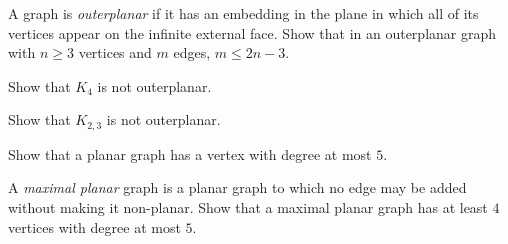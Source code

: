 \documentclass[12pt,letterpaper]{hmcpset}
\begin{document}

\begin{problem}[1]
    A graph is {\it outerplanar\/} if it has an embedding in the plane in which all of its vertices appear on the infinite external face. Show that in an outerplanar graph with $n\ge 3$ vertices and $m$ edges, $m\le 2n-3$.
\end{problem}
\begin{solution}
    \vfill
\end{solution}
\newpage

\begin{problem}[2]
    Show that $K_4$ is not outerplanar.
\end{problem}
\begin{solution}
    \vfill
\end{solution}
\newpage

\begin{problem}[3]
    Show that $K_{2,3}$ is not outerplanar.
\end{problem}
\begin{solution}
    \vfill
\end{solution}
\newpage

\begin{problem}[4]
    Show that a planar graph has a vertex with degree at most $5$.
\end{problem}
\begin{solution}
    \vfill
\end{solution}
\newpage

\begin{problem}[5]
    A {\it maximal planar \/} graph is a planar graph to which no edge may be added without making it non-planar. Show that a maximal planar graph has at least $4$ vertices with degree at most $5$.
\end{problem}
\begin{solution}
    \vfill
\end{solution}
\end{document}
